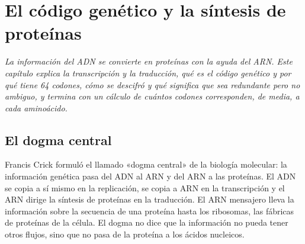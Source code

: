 \documentclass{book}
\begin{document}
\chapter{El código genético y la síntesis de proteínas}
\label{chap:bio-05}

\noindent\textit{La información del ADN se convierte en proteínas con la ayuda del ARN. Este capítulo explica la transcripción y la traducción, qué es el código genético y por qué tiene 64 codones, cómo se descifró y qué significa que sea redundante pero no ambiguo, y termina con un cálculo de cuántos codones corresponden, de media, a cada aminoácido.}


\section{El dogma central}

Francis Crick formuló el llamado «dogma central» de la biología molecular: la información genética pasa del ADN al ARN y del ARN a las proteínas. El ADN se copia a sí mismo en la replicación, se copia a ARN en la transcripción y el ARN dirige la síntesis de proteínas en la traducción. El ARN mensajero lleva la información sobre la secuencia de una proteína hasta los ribosomas, las fábricas de proteínas de la célula. El dogma no dice que la información no pueda tener otros flujos, sino que no pasa de la proteína a los ácidos nucleicos.

\end{document}
